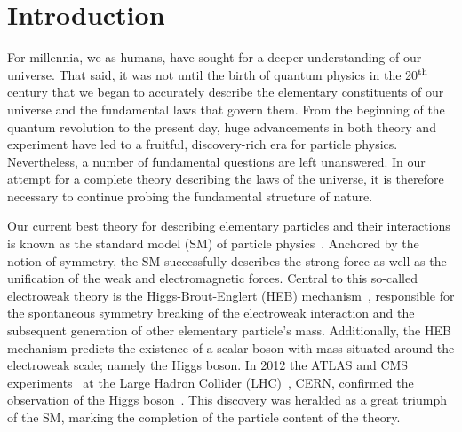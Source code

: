 \chapter{Introduction}
\label{chap:intro}

For millennia, we as humans, have sought for a deeper understanding of our universe. That said, it was not until the birth of quantum physics in the 20$^{\rm{th}}$ century that we began to accurately describe the elementary constituents of our universe and the fundamental laws that govern them. From the beginning of the quantum revolution to the present day, huge advancements in both theory and experiment have led to a fruitful, discovery-rich era for particle physics. Nevertheless, a number of fundamental questions are left unanswered. In our attempt for a complete theory describing the laws of the universe, it is therefore necessary to continue probing the fundamental structure of nature.

Our current best theory for describing elementary particles and their interactions is known as the standard model (SM) of particle physics~\cite{Glashow:1961tr,Weinberg:1967tq,Salam:1968rm}. Anchored by the notion of symmetry, the SM successfully describes the strong force as well as the unification of the weak and electromagnetic forces. Central to this so-called electroweak theory is the Higgs-Brout-Englert (HEB) mechanism~\cite{Englert:1964et,HIGGS1964132,Higgs:1964pj,Guralnik:1964eu,PhysRev.145.1156,PhysRev.155.1554}, responsible for the spontaneous symmetry breaking of the electroweak interaction and the subsequent generation of other elementary particle's mass. Additionally, the HEB mechanism predicts the existence of a scalar boson with mass situated around the electroweak scale; namely the Higgs boson. In 2012 the ATLAS and CMS experiments~\cite{Aad:2008zzm,Chatrchyan:2008zzk} at the Large Hadron Collider (LHC)~\cite{1748-0221-3-08-S08001}, CERN, confirmed the observation of the Higgs boson~\cite{Aad:2012tfa,Chatrchyan:2012xdj,Chatrchyan:2013lba}. This discovery was heralded as a great triumph of the SM, marking the completion of the particle content of the theory.

